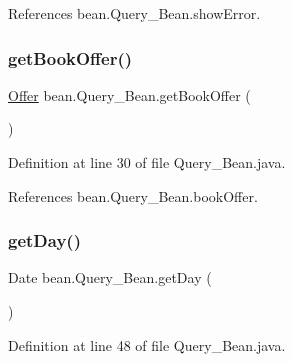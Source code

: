 References bean.\+Query\+\_\+\+Bean.\+show\+Error.

\mbox{\label{classbean_1_1Query__Bean_a24e8cd9b440666b540a2272d5df12e24}} 
\subsubsection{\texorpdfstring{getBookOffer()}{getBookOffer()}}
{\footnotesize\ttfamily \mbox{\hyperlink{classdomain_1_1Offer}{Offer}} bean.\+Query\+\_\+\+Bean.\+get\+Book\+Offer (\begin{DoxyParamCaption}{ }\end{DoxyParamCaption})}



Definition at line 30 of file Query\+\_\+\+Bean.\+java.


\begin{DoxyCode}{0}

\end{DoxyCode}


References bean.\+Query\+\_\+\+Bean.\+book\+Offer.

\mbox{\label{classbean_1_1Query__Bean_a34d5b9a6d575a9270079c5376822bd00}} 
\subsubsection{\texorpdfstring{getDay()}{getDay()}}
{\footnotesize\ttfamily Date bean.\+Query\+\_\+\+Bean.\+get\+Day (\begin{DoxyParamCaption}{ }\end{DoxyParamCaption})}



Definition at line 48 of file Query\+\_\+\+Bean.\+java.


\begin{DoxyCode}{0}

\end{DoxyCode}


